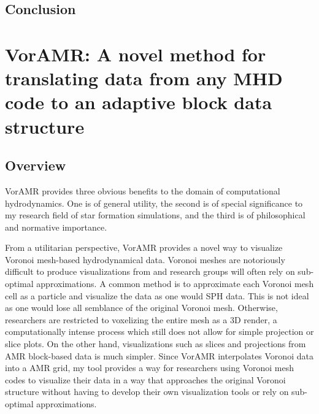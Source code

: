 \documentclass[twoside]{drexel-thesis}
\begin{document}
\begin{thesis}
\section{Conclusion}\label{sec:p1-conclusion}

\chapter[VorAMR]{VorAMR: A novel method for translating data from any MHD code to an adaptive block data structure}
\section{Overview}
VorAMR provides three obvious benefits to the domain of computational hydrodynamics. One is of general utility, the second is of special significance to my research field of star formation simulations, and the third is of philosophical and normative importance.

From a utilitarian perspective, VorAMR provides a novel way to visualize Voronoi mesh-based hydrodynamical data. Voronoi meshes are notoriously difficult to produce visualizations from and research groups will often rely on sub-optimal approximations. A common method is to approximate each Voronoi mesh cell as a particle and visualize the data as one would SPH data. This is not ideal as one would lose all semblance of the original Voronoi mesh. Otherwise, researchers are restricted to voxelizing the entire mesh as a 3D render, a computationally intense process which still does not allow for simple projection or slice plots. On the other hand, visualizations such as slices and projections from AMR block-based data is much simpler. Since VorAMR interpolates Voronoi data into a AMR grid, my tool provides a way for researchers using Voronoi mesh codes to visualize their data in a way that approaches the original Voronoi structure without having to develop their own visualization tools or rely on sub-optimal approximations.


\end{thesis}
\end{document}
